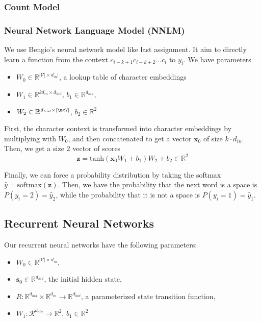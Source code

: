 \documentclass[11pt]{article}
\begin{document}
\subsubsection{Count Model}

\subsubsection{Neural Network Language Model (NNLM)}

We use Bengio's neural network model like last assignment. It aim to directly learn a function from the context $c_{i-k+1}c_{i-k+2}\dots c_i$ to $y_i$. We have parameters
\begin{itemize}
  \item $W_0 \in \mathbb{R}^{|\mathcal{V}| \times d_{in}|}$, a lookup table of character embeddings
  \item $W_1 \in \mathbb{R}^{kd_{in} \times d_{hid}}$, $b_1 \in \mathbb{R}^{d_{hid}}$,
  \item $W_2 \in \mathbb{R}^{d_{hid} \times |\mcV|}$, $b_2 \in \mathbb{R}^{2}$
\end{itemize}

First, the character context is transformed into character embeddings by multiplying with $W_0$, and then concatenated to get a vector $\mathbf{x}_0$ of size $k \cdot d_{in}$. Then, we get a size $2$ vector of scores
$$\mathbf{z} = \text{tanh}(\mathbf{x}_0W_1 + b_1)W_2 + b_2 \in \mathbb{R}^2$$

Finally, we can force a probability distribution by taking the softmax $\hat{y} = \text{softmax}(\mathbf{z})$. Then, we have the probability that the next word is a space is $P(y_i = 2) = \hat{y}_2$, while the probability that it is not a space is $P(y_i = 1) = \hat{y}_1$. 

\subsection{Recurrent Neural Networks}

Our recurrent neural networks have the following parameters:
\begin{itemize}
  \item $W_0 \in \mathbb{R}^{|\mathcal{V}| \times d_{in}}$,
  \item $\mathbf{s}_0 \in \mathbb{R}^{d_{hid}}$, the initial hidden state,
  \item $R: \mathbb{R}^{d_{hid}} \times \mathbb{R}^{d_{in}} \to \mathbb{R}^{d_{hid}}$, a parameterized state transition function,
  \item $W_1: \mathcal{R}^{d_{hid}} \to \mathbb{R}^2$, $b_1 \in \mathbb{R}^{2}$
\end{itemize}
\end{document}
